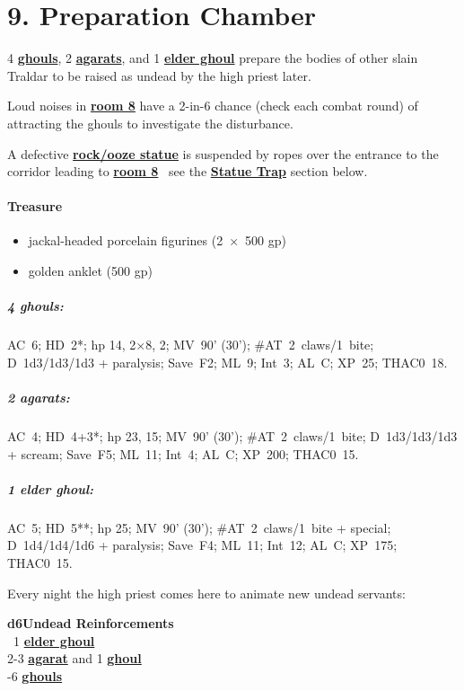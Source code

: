 \documentclass[english,11pt,openany,letterpaper,twocolumn]{book}
\begin{document}
\hypertarget{room9}{}
\section{9. Preparation Chamber}

4 \hyperlink{ghoul}{\textbf{ghouls}}, 2 \hyperlink{agarat}{\textbf{agarats}}, and 1 \hyperlink{elder-ghoul}{\textbf{elder ghoul}} prepare the bodies of other slain Traldar to be raised as undead by the high priest later.

\tab Loud noises in \hyperlink{room8}{\textbf{room 8}} have a 2-in-6 chance (check each combat round) of attracting the ghouls to investigate the disturbance.

\tab A defective \hyperlink{statue}{\textbf{rock/ooze statue}} is suspended by ropes over the entrance to the corridor leading to \hyperlink{room8}{\textbf{room 8}} \dash\ see the \hyperlink{statue-trap}{\textbf{Statue Trap}} section below.

\skipline
\paragraph{Treasure}
\begin{itemize}[leftmargin=*]
	\item jackal-headed porcelain figurines (2~×~500 gp)
	\item golden anklet (500 gp)
\end{itemize}


\begin{textbox}
	\subparagraph{4 ghouls:} AC~6; HD~2*; hp 14, 2×8, 2; MV~90' (30'); \#AT~2~claws/1~bite; D~1d3/1d3/1d3 + paralysis; Save~F2; ML~9; Int~3; AL~C; XP~25; THAC0~18.
	
	\subparagraph{2 agarats:} AC~4; HD~4+3*; hp 23, 15; MV~90' (30'); \#AT~2~claws/1~bite; D~1d3/1d3/1d3 + scream; Save~F5; ML~11; Int~4; AL~C; XP~200; THAC0~15.
	
	\subparagraph{1 elder ghoul:} AC~5; HD~5**; hp 25; MV~90' (30'); \#AT~2~claws/1~bite + special; D~1d4/1d4/1d6 + paralysis; Save~F4; ML~11; Int~12; AL~C; XP~175; THAC0~15.
\end{textbox}

\tab Every night the high priest comes here to animate new undead servants:

\ulf\textbf{d6}\tab\tab\textbf{Undead Reinforcements}\\
~1\tab{} \hyperlink{elder-ghoul}{\textbf{elder ghoul}}\\
2-3\tab{} \hyperlink{agarat}{\textbf{agarat}} and 1 \hyperlink{ghoul}{\textbf{ghoul}}\\
-6\tab{} \hyperlink{ghoul}{\textbf{ghouls}}
\end{document}
